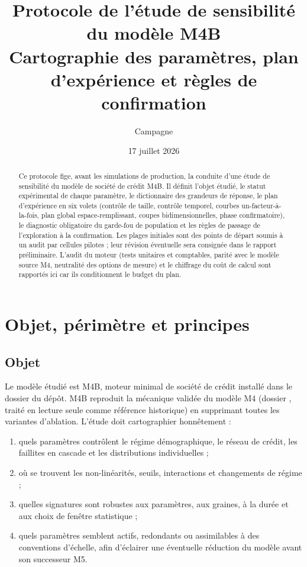 \documentclass[11pt,a4paper]{article}
\title{Protocole de l'étude de sensibilité du modèle M4B\\
\large Cartographie des paramètres, plan d'expérience et règles de confirmation}
\author{Campagne \code{recherche/sensibilite\_m4b}}
\date{17 juillet 2026}
\begin{document}
\maketitle

\begin{abstract}
Ce protocole fige, avant les simulations de production, la conduite d'une
étude de sensibilité du modèle de société de crédit M4B. Il définit l'objet
étudié, le statut expérimental de chaque paramètre, le dictionnaire des
grandeurs de réponse, le plan d'expérience en six volets (contrôle de
taille, contrôle temporel, courbes un-facteur-à-la-fois, plan global
espace-remplissant, coupes bidimensionnelles, phase confirmatoire), le
diagnostic obligatoire du garde-fou de population et les règles de passage
de l'exploration à la confirmation. Les plages initiales sont des points de
départ soumis à un audit par cellules pilotes ; leur révision éventuelle
sera consignée dans le rapport préliminaire. L'audit du moteur (tests
unitaires et comptables, parité avec le modèle source M4, neutralité des
options de mesure) et le chiffrage du coût de calcul sont rapportés ici car
ils conditionnent le budget du plan.
\end{abstract}

\tableofcontents

\section{Objet, périmètre et principes}

\subsection{Objet}

Le modèle étudié est M4B, moteur minimal de société de crédit installé
dans le dossier  du dépôt. M4B reproduit la
mécanique validée du modèle M4 (dossier , traité
en lecture seule comme référence historique) en supprimant toutes
les variantes d'ablation. L'étude doit cartographier honnêtement :

\begin{enumerate}
\item quels paramètres contrôlent le régime démographique, le réseau de
  crédit, les faillites en cascade et les distributions individuelles ;
\item où se trouvent les non-linéarités, seuils, interactions et
  changements de régime ;
\item quelles signatures sont robustes aux paramètres, aux graines, à la
  durée et aux choix de fenêtre statistique ;
\item quels paramètres semblent actifs, redondants ou assimilables à des
  conventions d'échelle, afin d'éclairer une éventuelle réduction du
  modèle avant son successeur M5.
\end{enumerate}
\end{document}
